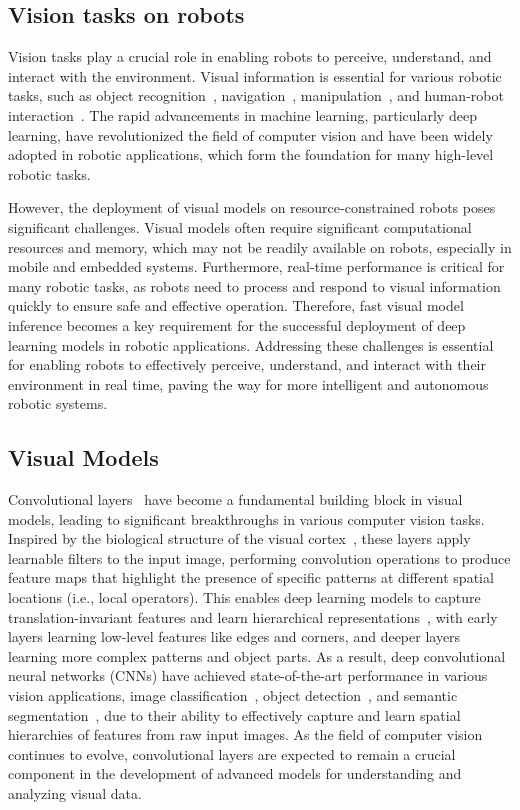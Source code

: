 \subsection{Vision tasks on robots}
Vision tasks play a crucial role in enabling robots to perceive, understand, and interact with the environment. 
Visual information is essential for various robotic tasks, such as object recognition~\cite{galvez2018object}, navigation~\cite{ran2017convolutional}, manipulation~\cite{bayar2018constrained}, and human-robot interaction~\cite{wu2019weight}. 
The rapid advancements in machine learning, particularly deep learning, have revolutionized the field of computer vision and have been widely adopted in robotic applications, which form the foundation for many high-level robotic tasks.

However, the deployment of visual models on resource-constrained robots poses significant challenges. 
Visual models often require significant computational resources and memory, which may not be readily available on robots, especially in mobile and embedded systems. 
Furthermore, real-time performance is critical for many robotic tasks, as robots need to process and respond to visual information quickly to ensure safe and effective operation. 
Therefore, fast visual model inference becomes a key requirement for the successful deployment of deep learning models in robotic applications.
Addressing these challenges is essential for enabling robots to effectively perceive, understand, and interact with their environment in real time, paving the way for more intelligent and autonomous robotic systems.


\subsection{Visual Models}
Convolutional layers~\cite{o2015introduction} have become a fundamental building block in visual models, leading to significant breakthroughs in various computer vision tasks. 
Inspired by the biological structure of the visual cortex~\cite{tripp2019approximating}, these layers apply learnable filters to the input image, performing convolution operations to produce feature maps that highlight the presence of specific patterns at different spatial locations (i.e., local operators). 
This enables deep learning models to capture translation-invariant features and learn hierarchical representations~\cite{ma2015hierarchical}, with early layers learning low-level features like edges and corners, and deeper layers learning more complex patterns and object parts. 
As a result, deep convolutional neural networks (CNNs) have achieved state-of-the-art performance in various vision applications, image classification~\cite{rawat2017deep}, object detection~\cite{galvez2018object}, and semantic segmentation~\cite{wang2018understanding}, due to their ability to effectively capture and learn spatial hierarchies of features from raw input images. 
As the field of computer vision continues to evolve, convolutional layers are expected to remain a crucial component in the development of advanced models for understanding and analyzing visual data.

